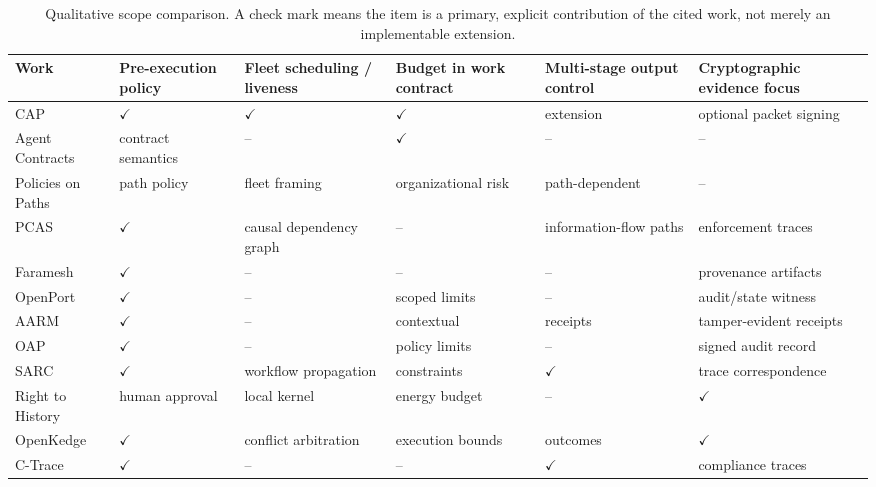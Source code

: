 \begin{table}[t]
\centering
\caption{Qualitative scope comparison. A check mark means the item is a primary, explicit contribution of the cited work, not merely an implementable extension.}
\label{tab:related}
\scriptsize
\setlength{\tabcolsep}{3pt}
\begin{tabularx}{\textwidth}{@{}l>{\centering\arraybackslash}X>{\centering\arraybackslash}X>{\centering\arraybackslash}X>{\centering\arraybackslash}X>{\centering\arraybackslash}X@{}}
\toprule
Work & Pre-execution policy & Fleet scheduling / liveness & Budget in work contract & Multi-stage output control & Cryptographic evidence focus \\
\midrule
CAP & $\checkmark$ & $\checkmark$ & $\checkmark$ & extension & optional packet signing \\
Agent Contracts & contract semantics & -- & $\checkmark$ & -- & -- \\
Policies on Paths & path policy & fleet framing & organizational risk & path-dependent & -- \\
PCAS & $\checkmark$ & causal dependency graph & -- & information-flow paths & enforcement traces \\
Faramesh & $\checkmark$ & -- & -- & -- & provenance artifacts \\
OpenPort & $\checkmark$ & -- & scoped limits & -- & audit/state witness \\
AARM & $\checkmark$ & -- & contextual & receipts & tamper-evident receipts \\
OAP & $\checkmark$ & -- & policy limits & -- & signed audit record \\
SARC & $\checkmark$ & workflow propagation & constraints & $\checkmark$ & trace correspondence \\
Right to History & human approval & local kernel & energy budget & -- & $\checkmark$ \\
OpenKedge & $\checkmark$ & conflict arbitration & execution bounds & outcomes & $\checkmark$ \\
C-Trace & $\checkmark$ & -- & -- & $\checkmark$ & compliance traces \\
\bottomrule
\end{tabularx}
\end{table}
